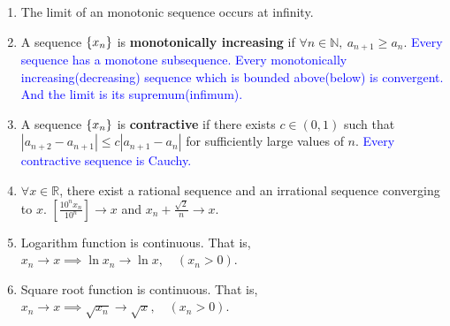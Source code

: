 \begin{enumerate}
	\item The limit of an monotonic sequence occurs at infinity.
	\item A sequence $\{x_n\}$ is \textbf{monotonically increasing} if $\forall n \in \mathbb{N},\ a_{n+1} \ge a_n$.
		\subitem \textcolor{blue}{Every sequence has a monotone subsequence.}
		\subitem \textcolor{blue}{Every monotonically increasing(decreasing) sequence which is bounded above(below) is convergent. And the limit is its supremum(infimum).}
	\item A sequence $\{x_n\}$ is \textbf{contractive} if there exists $c \in (0,1)$ such that $|a_{n+2}-a_{n+1}| \le c|a_{n+1}-a_n|$ for sufficiently large values of $n$.
		\subitem \textcolor{blue}{Every contractive sequence is Cauchy.}
	\item $\forall x \in \mathbb{R}$, there exist a rational sequence and an irrational sequence converging to $x$.
		$\left[ \frac{10^n x_n}{10^n} \right] \to x$ and $ x_n + \frac{\sqrt{2}}{n} \to x$.
	\item Logarithm function is continuous.
		That is, $x_n \to x \implies \ln{x_n} \to \ln{x}, \quad (x_n > 0)$.
	\item Square root function is continuous.
		That is, $x_n \to x \implies \sqrt{x_n} \to \sqrt{x}, \quad (x_n > 0)$.
\end{enumerate}
